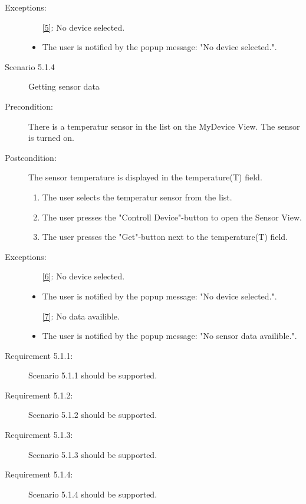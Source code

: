 \documentclass[a4paper]{article}
\begin{document}
\begin{description}
\item[Exceptions:]

\begin{itemize}
\item [\ref{5}:] No device selected.
\item The user is notified by the popup message: "No device selected.".
\end{itemize}

\item[]

\item[Scenario 5.1.4] Getting sensor data
\item[Precondition:] There is a temperatur sensor in the list on the MyDevice View. The sensor is turned on.
\item[Postcondition:] The sensor temperature is displayed in the temperature(T) field.
\begin{enumerate}
\item The user selects the temperatur sensor from the list.
\item \label{6} The user presses the "Controll Device"-button to open the Sensor View.
\item \label{7} The user presses the "Get"-button next to the temperature(T) field.

\end{enumerate}

\item[Exceptions:]
\item[]

\begin{itemize}
\item [\ref{6}:] No device selected.
\item The user is notified by the popup message: "No device selected.".
\end{itemize}

\begin{itemize}
\item [\ref{7}:] No data availible.
\item The user is notified by the popup message: "No sensor data availible.".
\end{itemize}

\item[Requirement 5.1.1:] Scenario 5.1.1 should be supported.
\item[Requirement 5.1.2:] Scenario 5.1.2 should be supported.
\item[Requirement 5.1.3:] Scenario 5.1.3 should be supported.
\item[Requirement 5.1.4:] Scenario 5.1.4 should be supported.

\end{description}
\end{document}
